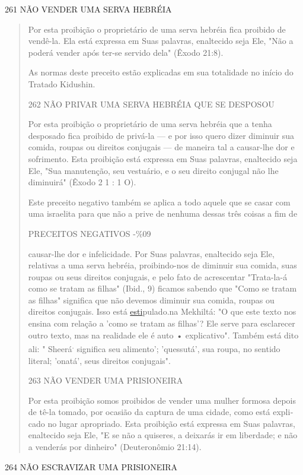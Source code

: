 261 NÃO VENDER UMA SERVA HEBRÉIA

\begin{quote}
Por esta proibição o proprietário de uma serva hebréia fica proibido de
vendê-la. Ela está expressa em Suas palavras, enaltecido seja Ele, "Não
a po­derá vender após ter-se servido dela" (Êxodo 21:8).

As normas deste preceito estão explicadas em sua totalidade no iní­cio
do Tratado Kidushin.

262 NÃO PRIVAR UMA SERVA HEBRÉIA QUE SE DESPOSOU

Por esta proibição o proprietário de uma serva hebréia que a tenha
desposado fica proibido de privá-la --- e por isso quero dizer diminuir
sua co­mida, roupas ou direitos conjugais --- de maneira tal a
causar-lhe dor e sofri­mento. Esta proibição está expressa em Suas
palavras, enaltecido seja Ele, "Sua manutenção, seu vestuário, e o seu
direito conjugal não lhe diminuirá" (Êxodo 2 1 : 1 O).

Este preceito negativo também se aplica a todo aquele que se casar com
uma israelita para que não a prive de nenhuma dessas três coisas a fim
de

PRECEITOS NEGATIVOS -\%09

causar-lhe dor e infelicidade. Por Suas palavras, enaltecido seja Ele,
relativas a uma serva hebréia, proibindo-nos de diminuir sua comida,
suas roupas ou seus direitos conjugais, e pelo fato de acrescentar
"Trata-la-á como se tratam as fi­lhas" (Ibid., 9) ficamos sabendo que
"Como se tratam as filhas" significa que não devemos diminuir sua
comida, roupas ou direitos conjugais. Isso está
{\href{http://esti-pulado.na}{esti­}pulado.na} Mekhiltá: "O que este
texto nos ensina com relação a 'como se tra­tam as filhas'? Ele serve
para esclarecer outro texto, mas na realidade ele é auto • explicativo".
Também está dito ali: " Sheerá\textsuperscript{.} significa seu
alimento'; 'quessu­tá', sua roupa, no sentido literal; 'onatá', seus
direitos conjugais".

263 NÃO VENDER UMA PRISIONEIRA

Por esta proibição somos proibidos de vender uma mulher formosa depois
de tê-la tomado, por ocasião da captura de uma cidade, como está
expli­cado no lugar apropriado. Esta proibição está expressa em Suas
palavras, enal­tecido seja Ele, "E se não a quiseres, a deixarás ir em
liberdade; e não a vende­rás por dinheiro" (Deuteronômio 21:14).
\end{quote}

264 NÃO ESCRAVIZAR UMA PRISIONEIRA

